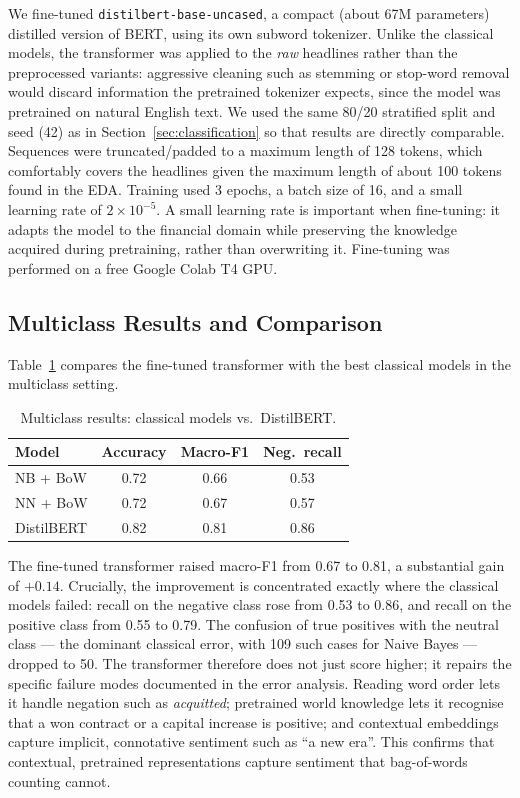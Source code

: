 \documentclass[sigconf,nonacm]{acmart}
\begin{document}
We fine-tuned \texttt{distilbert-base-uncased}, a compact (about 67M parameters) distilled version of BERT, using its own subword tokenizer. Unlike the classical models, the transformer was applied to the \emph{raw} headlines rather than the preprocessed variants: aggressive cleaning such as stemming or stop-word removal would discard information the pretrained tokenizer expects, since the model was pretrained on natural English text. We used the same 80/20 stratified split and seed (42) as in Section~\ref{sec:classification} so that results are directly comparable. Sequences were truncated/padded to a maximum length of 128 tokens, which comfortably covers the headlines given the maximum length of about 100 tokens found in the EDA. Training used 3 epochs, a batch size of 16, and a small learning rate of $2\times10^{-5}$. A small learning rate is important when fine-tuning: it adapts the model to the financial domain while preserving the knowledge acquired during pretraining, rather than overwriting it. Fine-tuning was performed on a free Google Colab T4 GPU.

\subsection{Multiclass Results and Comparison}

Table~\ref{tab:transformer-multi} compares the fine-tuned transformer with the best classical models in the multiclass setting.

\begin{table}[t]
\centering
\caption{Multiclass results: classical models vs.\ DistilBERT.}
\label{tab:transformer-multi}
\begin{tabular}{lccc}
\toprule
Model & Accuracy & Macro-F1 & Neg.\ recall \\
\midrule
NB + BoW   & 0.72 & 0.66 & 0.53 \\
NN + BoW   & 0.72 & 0.67 & 0.57 \\
DistilBERT & 0.82 & 0.81 & 0.86 \\
\bottomrule
\end{tabular}
\end{table}

The fine-tuned transformer raised macro-F1 from 0.67 to 0.81, a substantial gain of $+0.14$. Crucially, the improvement is concentrated exactly where the classical models failed: recall on the negative class rose from 0.53 to 0.86, and recall on the positive class from 0.55 to 0.79. The confusion of true positives with the neutral class --- the dominant classical error, with 109 such cases for Naive Bayes --- dropped to 50. The transformer therefore does not just score higher; it repairs the specific failure modes documented in the error analysis. Reading word order lets it handle negation such as \textit{acquitted}; pretrained world knowledge lets it recognise that a won contract or a capital increase is positive; and contextual embeddings capture implicit, connotative sentiment such as ``a new era''. This confirms that contextual, pretrained representations capture sentiment that bag-of-words counting cannot.
\end{document}

